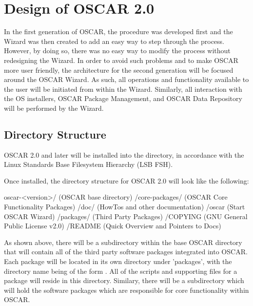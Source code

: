%
%
%

\section{Design of OSCAR 2.0}

In the first generation of OSCAR, the procedure was developed first
and the Wizard was then created to add an easy way to step through the
process. However, by doing so, there was no easy way to modify the
process without redesigning the Wizard. In order to avoid such
problems and to make OSCAR more user friendly, the architecture for
the second generation will be focused around the OSCAR Wizard. As
such, all operations and functionality available to the user will be
initiated from within the Wizard. Similarly, all interaction with the
OS installers, OSCAR Package Management, and OSCAR Data Repository
will be performed by the Wizard.

\subsection{Directory Structure}

OSCAR 2.0 and later will be installed into the  directory,
in accordance with the Linux Standards Base Filesystem Hierarchy (LSB
FSH).

Once installed, the directory structure for OSCAR 2.0 will look
like the following:

oscar-<version>/                  (OSCAR base directory)
               /core-packages/    (OSCAR Core Functionality Packages)
               /doc/              (HowTos and other documentation)
               /oscar             (Start OSCAR Wizard)
               /packages/         (Third Party Packages)
               /COPYING           (GNU General Public License v2.0)       
               /README            (Quick Overview and Pointers to Docs)

As shown above, there will be a  subdirectory within
the base OSCAR directory that will contain all of the third party
software packages integrated into OSCAR. Each package will be located
in its own directory under 'packages', with the directory name being
of the form . All of the scripts and supporting files
for a package will reside in this directory.  Similary, there will be
a  subdirectory which will hold the software
packages which are responsible for core functionality within OSCAR.

